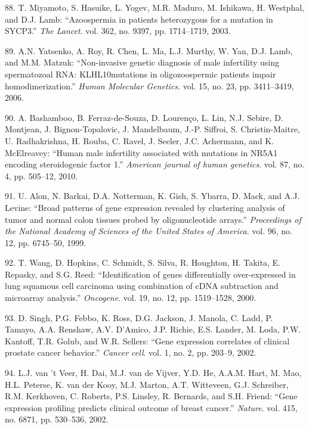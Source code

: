\documentclass[12pt,twoside]{ugathesis}
\theoremstyle{definition}
\theoremstyle{definition}
\theoremstyle{remark}
\begin{document}
\hypertarget{ref-Miyamoto2003}{}
88. T. Miyamoto, S. Hasuike, L. Yogev, M.R. Maduro, M. Ishikawa, H.
Westphal, and D.J. Lamb: ``Azoospermia in patients heterozygous for a
mutation in SYCP3.'' \emph{The Lancet}. vol. 362, no. 9397, pp.
1714--1719, 2003.

\hypertarget{ref-Yatsenko2006}{}
89. A.N. Yatsenko, A. Roy, R. Chen, L. Ma, L.J. Murthy, W. Yan, D.J.
Lamb, and M.M. Matzuk: ``Non-invasive genetic diagnosis of male
infertility using spermatozoal RNA: KLHL10mutations in oligozoospermic
patients impair homodimerization.'' \emph{Human Molecular Genetics}.
vol. 15, no. 23, pp. 3411--3419, 2006.

\hypertarget{ref-Bashamboo2010}{}
90. A. Bashamboo, B. Ferraz-de-Souza, D. Lourenço, L. Lin, N.J. Sebire,
D. Montjean, J. Bignon-Topalovic, J. Mandelbaum, J.-P. Siffroi, S.
Christin-Maitre, U. Radhakrishna, H. Rouba, C. Ravel, J. Seeler, J.C.
Achermann, and K. McElreavey: ``Human male infertility associated with
mutations in NR5A1 encoding steroidogenic factor 1.'' \emph{American
journal of human genetics}. vol. 87, no. 4, pp. 505--12, 2010.

\hypertarget{ref-Alon1999}{}
91. U. Alon, N. Barkai, D.A. Notterman, K. Gish, S. Ybarra, D. Mack, and
A.J. Levine: ``Broad patterns of gene expression revealed by clustering
analysis of tumor and normal colon tissues probed by oligonucleotide
arrays.'' \emph{Proceedings of the National Academy of Sciences of the
United States of America}. vol. 96, no. 12, pp. 6745--50, 1999.

\hypertarget{ref-Wang2000}{}
92. T. Wang, D. Hopkins, C. Schmidt, S. Silva, R. Houghton, H. Takita,
E. Repasky, and S.G. Reed: ``Identification of genes differentially
over-expressed in lung squamous cell carcinoma using combination of cDNA
subtraction and microarray analysis.'' \emph{Oncogene}. vol. 19, no. 12,
pp. 1519--1528, 2000.

\hypertarget{ref-Singh2002}{}
93. D. Singh, P.G. Febbo, K. Ross, D.G. Jackson, J. Manola, C. Ladd, P.
Tamayo, A.A. Renshaw, A.V. D'Amico, J.P. Richie, E.S. Lander, M. Loda,
P.W. Kantoff, T.R. Golub, and W.R. Sellers: ``Gene expression correlates
of clinical prostate cancer behavior.'' \emph{Cancer cell}. vol. 1, no.
2, pp. 203--9, 2002.

\hypertarget{ref-VantVeer2002}{}
94. L.J. van 't Veer, H. Dai, M.J. van de Vijver, Y.D. He, A.A.M. Hart,
M. Mao, H.L. Peterse, K. van der Kooy, M.J. Marton, A.T. Witteveen, G.J.
Schreiber, R.M. Kerkhoven, C. Roberts, P.S. Linsley, R. Bernards, and
S.H. Friend: ``Gene expression profiling predicts clinical outcome of
breast cancer.'' \emph{Nature}. vol. 415, no. 6871, pp. 530--536, 2002.
\end{document}
